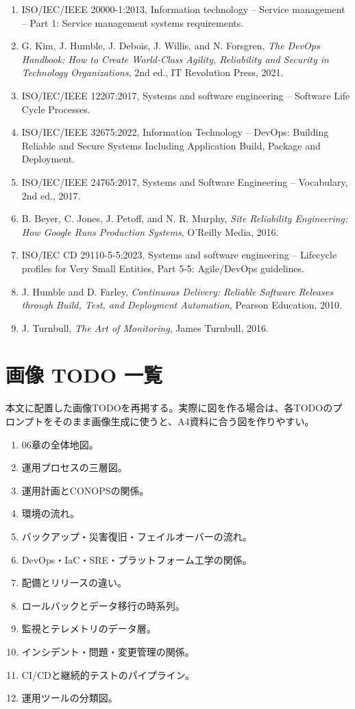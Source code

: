 \documentclass[uplatex,dvipdfmx,a4paper,10pt]{jsarticle}
\begin{document}
\begin{enumerate}[label={\arabic*.}]
  \item ISO/IEC/IEEE 20000-1:2013, Information technology -- Service management -- Part 1: Service management systems requirements.
  \item G. Kim, J. Humble, J. Debois, J. Willis, and N. Forsgren, \textit{The DevOps Handbook: How to Create World-Class Agility, Reliability and Security in Technology Organizations}, 2nd ed., IT Revolution Press, 2021.
  \item ISO/IEC/IEEE 12207:2017, Systems and software engineering -- Software Life Cycle Processes.
  \item ISO/IEC/IEEE 32675:2022, Information Technology -- DevOps: Building Reliable and Secure Systems Including Application Build, Package and Deployment.
  \item ISO/IEC/IEEE 24765:2017, Systems and Software Engineering -- Vocabulary, 2nd ed., 2017.
  \item B. Beyer, C. Jones, J. Petoff, and N. R. Murphy, \textit{Site Reliability Engineering: How Google Runs Production Systems}, O'Reilly Media, 2016.
  \item ISO/IEC CD 29110-5-5:2023, Systems and software engineering -- Lifecycle profiles for Very Small Entities, Part 5-5: Agile/DevOps guidelines.
  \item J. Humble and D. Farley, \textit{Continuous Delivery: Reliable Software Releases through Build, Test, and Deployment Automation}, Pearson Education, 2010.
  \item J. Turnbull, \textit{The Art of Monitoring}, James Turnbull, 2016.
\end{enumerate}

\section{画像 TODO 一覧}

本文に配置した画像TODOを再掲する。実際に図を作る場合は、各TODOのプロンプトをそのまま画像生成に使うと、A4資料に合う図を作りやすい。

\begin{enumerate}
  \item 06章の全体地図。
  \item 運用プロセスの三層図。
  \item 運用計画とCONOPSの関係。
  \item 環境の流れ。
  \item バックアップ・災害復旧・フェイルオーバーの流れ。
  \item DevOps・IaC・SRE・プラットフォーム工学の関係。
  \item 配備とリリースの違い。
  \item ロールバックとデータ移行の時系列。
  \item 監視とテレメトリのデータ層。
  \item インシデント・問題・変更管理の関係。
  \item CI/CDと継続的テストのパイプライン。
  \item 運用ツールの分類図。
\end{enumerate}
\end{document}
